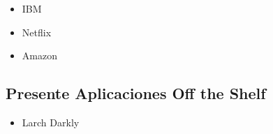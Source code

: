 \documentclass[12pt]{report} %
\begin{document}
\begin{itemize}
  \item{IBM}
  \item{Netflix}
  \item{Amazon}
\end{itemize}

\subsection{Presente Aplicaciones Off the Shelf}

\begin{itemize}
  \item{Larch Darkly}
\end{itemize}





\end{document}
